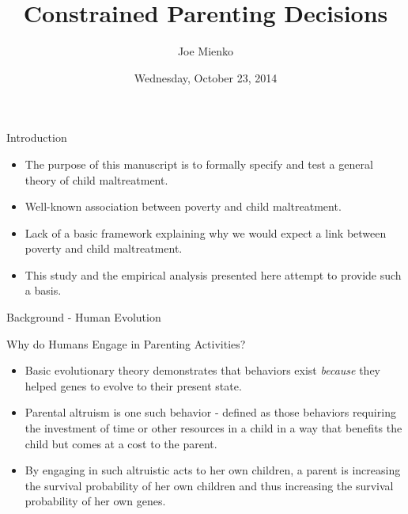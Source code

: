 \documentclass[handout]{beamer}
\title{Constrained Parenting Decisions}
\author{Joe Mienko}
\date{Wednesday, October 23, 2014}
\begin{document}
\frame{\titlepage}

\begin{frame}{Introduction}

\begin{itemize}[<+->]
\itemsep1pt\parskip0pt
\item
  The purpose of this manuscript is to formally specify and test a
  general theory of child maltreatment.
\end{itemize}

\begin{itemize}[<+->]
\itemsep1pt\parskip0pt
\item
  Well-known association between poverty and child maltreatment.
\end{itemize}

\begin{itemize}[<+->]
\itemsep1pt\parskip0pt
\item
  Lack of a basic framework explaining why we would expect a link
  between poverty and child maltreatment.
\end{itemize}

\begin{itemize}[<+->]
\itemsep1pt\parskip0pt
\item
  This study and the empirical analysis presented here attempt to
  provide such a basis.
\end{itemize}

\end{frame}

\begin{frame}{Background - Human Evolution}

\begin{block}{Why do Humans Engage in Parenting Activities?}

\begin{itemize}[<+->]
\itemsep1pt\parskip0pt
\item
  Basic evolutionary theory demonstrates that behaviors exist
  \emph{because} they helped genes to evolve to their present state.
\end{itemize}

\begin{itemize}[<+->]
\itemsep1pt\parskip0pt
\item
  Parental altruism is one such behavior - defined as those behaviors
  requiring the investment of time or other resources in a child in a
  way that benefits the child but comes at a cost to the parent.
\end{itemize}

\begin{itemize}[<+->]
\itemsep1pt\parskip0pt
\item
  By engaging in such altruistic acts to her own children, a parent is
  increasing the survival probability of her own children and thus
  increasing the survival probability of her own genes.
\end{itemize}

\end{block}

\end{frame}
\end{document}
